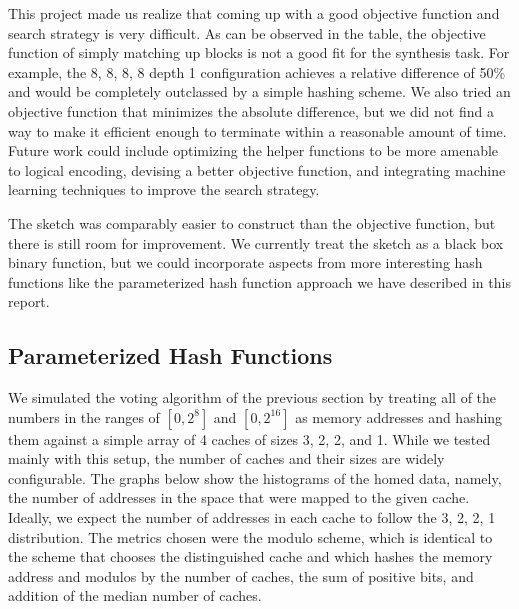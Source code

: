 This project made us realize that coming up with a good objective function and
search strategy is very difficult. As can be observed in the table, the
objective function of simply matching up blocks is not a good fit for the
synthesis task. For example, the 8, 8, 8, 8 depth 1 configuration achieves a
relative difference of 50\% and would be completely outclassed by a simple
hashing scheme. We also tried an objective function that minimizes the absolute
difference, but we did not find a way to make it efficient enough to terminate
within a reasonable amount of time. Future work could include optimizing the
helper functions to be more amenable to logical encoding, devising a better
objective function, and integrating machine learning techniques to improve the
search strategy.

The sketch was comparably easier to construct than the objective function, but
there is still room for improvement. We currently treat the sketch as a black
box binary function, but we could incorporate aspects from more interesting hash
functions like the parameterized hash function approach we have described in
this report.

\subsection{Parameterized Hash Functions}

We simulated the voting algorithm of the previous section by treating all of the
numbers in the ranges of $[0, 2^{8}]$ and $[0, 2^{16}]$ as memory addresses and
hashing them against a simple array of 4 caches of sizes 3, 2, 2, and 1.  While
we tested mainly with this setup, the number of caches and their sizes are
widely configurable.  The graphs below show the histograms of the homed data,
namely, the number of addresses in the space that were mapped to the given
cache.  Ideally, we expect the number of addresses in each cache to follow the
3, 2, 2, 1 distribution.  The metrics chosen were the modulo scheme, which is
identical to the scheme that chooses the distinguished cache and which hashes
the memory address and modulos by the number of caches, the sum of positive
bits, and addition of the median number of caches.


